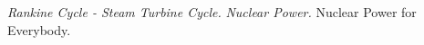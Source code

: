\documentclass[10pt,cleanfoot]{asme2ej}
\begin{document}

\begin{thebibliography}{12}
 {\em Rankine Cycle - Steam Turbine Cycle.}
{\em Nuclear Power.}
{Nuclear Power for Everybody.}
\end{thebibliography}




\end{document}
